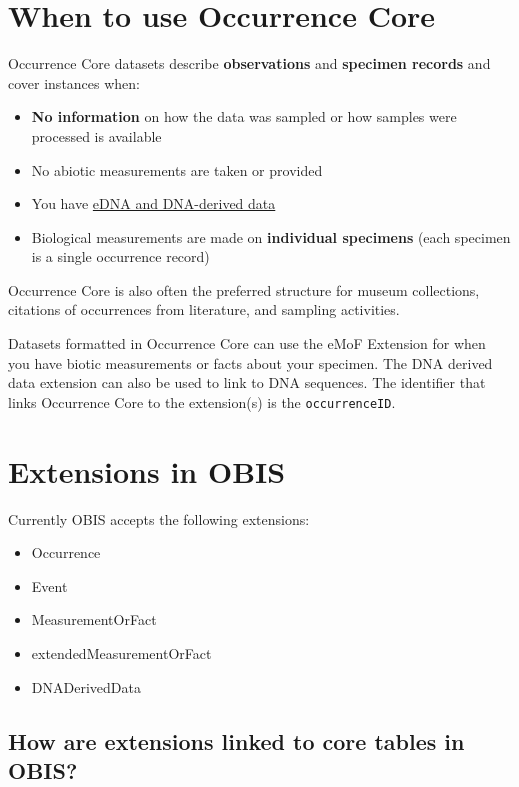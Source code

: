 \documentclass[
  letterpaper,
  DIV=11,
  numbers=noendperiod,
  oneside]{scrreprt}
\providecommand{\tightlist}{%
  \setlength{\itemsep}{0pt}\setlength{\parskip}{0pt}}\usepackage{longtable,booktabs,array}
\begin{document}
\hypertarget{when-to-use-occurrence-core}{%
\section{When to use Occurrence
Core}\label{when-to-use-occurrence-core}}

Occurrence Core datasets describe \textbf{observations} and
\textbf{specimen records} and cover instances when:

\begin{itemize}
\tightlist
\item
  \textbf{No information} on how the data was sampled or how samples
  were processed is available
\item
  No abiotic measurements are taken or provided
\item
  You have \protect\hyperlink{edna-dna-derived-data}{eDNA and
  DNA-derived data}
\item
  Biological measurements are made on \textbf{individual specimens}
  (each specimen is a single occurrence record)
\end{itemize}

Occurrence Core is also often the preferred structure for museum
collections, citations of occurrences from literature, and sampling
activities.

Datasets formatted in Occurrence Core can use the eMoF Extension for
when you have biotic measurements or facts about your specimen. The DNA
derived data extension can also be used to link to DNA sequences. The
identifier that links Occurrence Core to the extension(s) is the
\texttt{occurrenceID}.

\hypertarget{extensions-in-obis}{%
\section{Extensions in OBIS}\label{extensions-in-obis}}

Currently OBIS accepts the following extensions:

\begin{itemize}
\tightlist
\item
  Occurrence
\item
  Event
\item
  MeasurementOrFact
\item
  extendedMeasurementOrFact
\item
  DNADerivedData
\end{itemize}

\hypertarget{how-are-extensions-linked-to-core-tables-in-obis}{%
\subsection{How are extensions linked to core tables in
OBIS?}\label{how-are-extensions-linked-to-core-tables-in-obis}}
\end{document}
